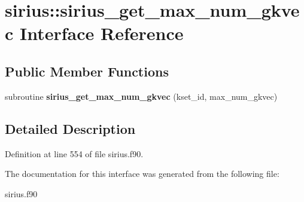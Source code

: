 \hypertarget{interfacesirius_1_1sirius__get__max__num__gkvec}{}\section{sirius\+:\+:sirius\+\_\+get\+\_\+max\+\_\+num\+\_\+gkvec Interface Reference}
\label{interfacesirius_1_1sirius__get__max__num__gkvec}
\subsection*{Public Member Functions}
\begin{DoxyCompactItemize}
\item 
\hypertarget{interfacesirius_1_1sirius__get__max__num__gkvec_ade31ad123568c00d8727a63882105521}{}subroutine {\bfseries sirius\+\_\+get\+\_\+max\+\_\+num\+\_\+gkvec} (kset\+\_\+id, max\+\_\+num\+\_\+gkvec)\label{interfacesirius_1_1sirius__get__max__num__gkvec_ade31ad123568c00d8727a63882105521}

\end{DoxyCompactItemize}


\subsection{Detailed Description}


Definition at line 554 of file sirius.\+f90.



The documentation for this interface was generated from the following file\+:\begin{DoxyCompactItemize}
\item 
sirius.\+f90\end{DoxyCompactItemize}
